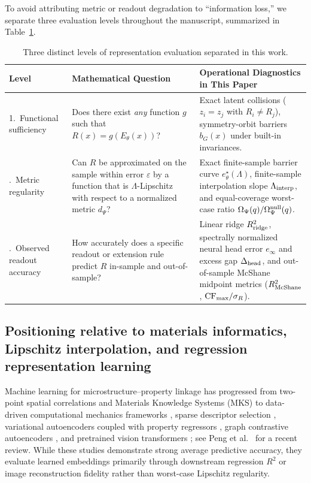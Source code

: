 \documentclass[preprint,11pt,a4paper]{elsarticle}
\begin{document}
To avoid attributing metric or readout degradation to ``information loss,'' we separate three evaluation levels throughout the manuscript, summarized in Table~\ref{tab:three_levels}.

\begin{table}[ht!]
\centering
\caption{Three distinct levels of representation evaluation separated in this work.}
\label{tab:three_levels}
\footnotesize
\setlength{\tabcolsep}{5.0pt}
\begin{tabular}{p{}p{}p{}}
\toprule
Level & Mathematical Question & Operational Diagnostics in This Paper \\
\midrule
1.\ Functional sufficiency & Does there exist \emph{any} function $g$ such that $R(x)=g(E_\theta(x))$? & Exact latent collisions ($z_i=z_j$ with $R_i\ne R_j$), symmetry-orbit barriers $b_G(x)$ under built-in invariances. \\
\addlinespace[3pt]
2.\ Metric regularity & Can $R$ be approximated on the sample within error $\varepsilon$ by a function that is $\Lambda$-Lipschitz with respect to a normalized metric $d_\Psi$? & Exact finite-sample barrier curve $e^\star_\theta(\Lambda)$, finite-sample interpolation slope $\Lambda_{\rm interp}$, and equal-coverage worst-case ratio $\Omega_\Psi(q)/\Omega_\Psi^{\rm null}(q)$. \\
\addlinespace[3pt]
3.\ Observed readout accuracy & How accurately does a specific readout or extension rule predict $R$ in-sample and out-of-sample? & Linear ridge $R^2_{\rm ridge}$, spectrally normalized neural head error $e_\infty$ and excess gap $\Delta_{\rm head}$, and out-of-sample McShane midpoint metrics ($R^2_{\rm McShane}$, ${\rm CF}_{\max}/\sigma_R$). \\
\bottomrule
\end{tabular}
\end{table}

\subsection{Positioning relative to materials informatics, Lipschitz interpolation, and regression representation learning}
\label{sec:positioning}

Machine learning for microstructure--property linkage has progressed from two-point spatial correlations and Materials Knowledge Systems (MKS) \cite{Fullwood2010} to data-driven computational mechanics frameworks \cite{Bessa2017}, sparse descriptor selection \cite{Ghiringhelli2015,Guru2025}, variational autoencoders coupled with property regressors \cite{Templeton2024}, graph contrastive autoencoders \cite{Chen2024}, and pretrained vision transformers \cite{Whitman2025}; see Peng et al.~\cite{Peng2025} for a recent review. While these studies demonstrate strong average predictive accuracy, they evaluate learned embeddings primarily through downstream regression $R^2$ or image reconstruction fidelity rather than worst-case Lipschitz regularity.
\end{document}
